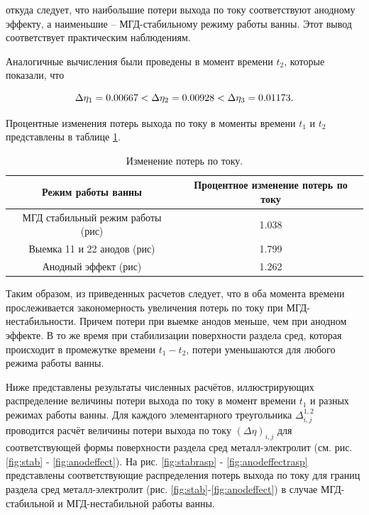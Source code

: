 \documentclass[]{pmi}
\begin{document}
откуда следует, что наибольшие потери выхода по току соответствуют анодному эффекту, а наименьшие – МГД-стабильному режиму работы ванны. Этот вывод соответствует практическим наблюдениям.

Аналогичные вычисления были проведены в момент времени $t_2$, которые показали, что

\begin{equation}
\Delta\eta_1 = 0.00667 < \Delta\eta_2 = 0.00928 < \Delta\eta_3 = 0.01173. \notag
\end{equation}

Процентные изменения потерь выхода по току в моменты времени $t_1$ и $t_2$ представлены в таблице \ref{table:ismineniep}. 

\begin{table}[H]
\centering
\begin{tabular}{|c|c|}
\hline
Режим работы ванны & Процентное изменение потерь по току \\
\hline
МГД стабильный режим работы (рис) & 1.038	\\
\hline
Выемка 11 и 22 анодов (рис) &	1.799\\
\hline
Анодный эффект (рис) & 1.262	\\
\hline
\end{tabular}
\caption{Изменение потерь по току. \label{table:ismineniep}}
\end{table}

Таким образом, из приведенных расчетов следует, что в оба момента времени прослеживается закономерность увеличения потерь по току при МГД-нестабильности. Причем потери при выемке анодов меньше, чем при анодном эффекте. В то же время при стабилизации поверхности раздела сред, которая происходит в промежутке времени $t_1 - t_2$, потери уменьшаются для любого режима работы ванны.

Ниже представлены результаты численных расчётов, иллюстрирующих распределение величины потери выхода по току в момент времени $t_1$ и разных режимах работы ванны. Для каждого элементарного треугольника $\Delta^{1,2}_{i,j}$ проводится расчёт величины потери выхода по току $(\Delta\eta)_{i,j}$ для соответствующей формы поверхности раздела сред металл-электролит (см. рис. \ref{fig:stab} - \ref{fig:anodeffect}). На рис. \ref{fig:stabrasp} - \ref{fig:anodeffectrasp} представлены соответствующие распределения потерь выхода по току для границ раздела сред металл-электролит (рис. \ref{fig:stab}-\ref{fig:anodeffect}) в случае МГД-стабильной и МГД-нестабильной работы ванны.
\end{document}
